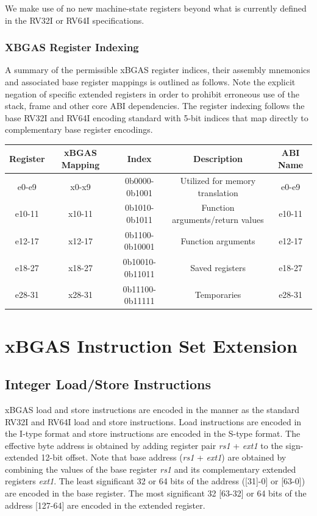 \documentclass{article}
\begin{document}
We make use of no new machine-state registers beyond what is 
currently defined in the RV32I or RV64I specifications.  

\newpage
\subsubsection{XBGAS Register Indexing}
A summary of the permissible xBGAS register indices, their assembly 
mnemonics and associated base register mappings is outlined as follows.  
Note the explicit negation of specific extended registers in order to prohibit 
erroneous use of the stack, frame and other core ABI dependencies.  The register 
indexing follows the base RV32I and RV64I encoding standard with 5-bit indices that 
map directly to complementary base register encodings.  

\begin{center}
\begin{tabular}{| c | c | c | c | c |}
\hline
Register & xBGAS Mapping & Index & Description & ABI Name\\ \hline
\hline
e0-e9 & x0-x9 & 0b0000-0b1001 & Utilized for memory translation & e0-e9\\
\hline
e10-11 & x10-11 & 0b1010-0b1011 & Function arguments/return values & e10-11\\
\hline
e12-17 & x12-17 & 0b1100-0b10001 & Function arguments & e12-17\\
\hline
e18-27 & x18-27 & 0b10010-0b11011 & Saved registers & e18-27\\
\hline
e28-31 & x28-31 & 0b11100-0b11111 & Temporaries & e28-31\\
\hline
\end{tabular}
\end{center}

\newpage
\section{xBGAS Instruction Set Extension}

\subsection{Integer Load/Store Instructions}

xBGAS load and store instructions are encoded in the manner as the standard RV32I and 
RV64I load and store instructions.  Load instructions are encoded in the I-type format and store 
instructions are encoded in the S-type format.  The effective byte address is obtained by adding 
register pair \textit{rs1} + \textit{ext1} to the sign-extended 12-bit offset.  Note that base address 
(\textit{rs1} + \textit{ext1}) are obtained by combining the values of the base register \textit{rs1} 
and its complementary extended registers \textit{ext1}.  The least significant 32 or 64 bits of the address
([31]-0] or [63-0]) are encoded in the base register.  The most significant 32 [63-32] or 64 bits of the address [127-64] 
are encoded in the extended register.  
\end{document}
